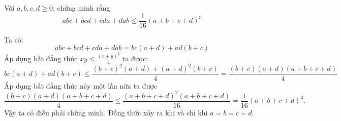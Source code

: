 \begin{problem}
    Với $a, b, c, d \ge 0$, chứng minh rằng
    $$
        abc + bcd + cda + dab \le \frac{1}{16}(a + b + c + d)^3
    $$
    \solution
    
    Ta có:
    $$
        abc + bcd + cda + dab = bc(a + d) + ad(b + c)
    $$
    Áp dụng bất đẳng thức $\displaystyle xy \le \frac{(x + y)^2}{4}$ ta được:
    $$
        bc(a + d) + ad(b + c) \le \frac{(b + c)^2(a + d) + (a + d)^2(b + c)}{4} =
        \frac{(b + c)(a + d)(a + b + c + d)}{4}
    $$
    Áp dụng bất đẳng thức này một lần nữa ta được
    $$
        \frac{(b + c)(a + d)(a + b + c + d)}{4} \le \frac{(a + b + c + d)^2(a + b + c + d)}{16}
        = \frac{1}{16}(a + b + c + d)^3.
    $$
    Vậy ta có điều phải chứng minh. Đẳng thức xảy ra khi và chỉ khi $a = b = c = d$.
\end{problem}
